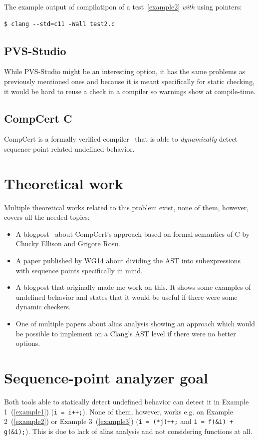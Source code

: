 The example output of compilatipon of a test~\ref{example2} \emph{with} using pointers:
\begin{lstlisting}
$ clang --std=c11 -Wall test2.c 
\end{lstlisting}
\subsection{PVS-Studio}
While PVS-Studio might be an interesting option, it has the same problems as previously mentioned ones and because it is meant specifically for static checking, it would be hard to reuse a check in a compiler so warnings show at compile-time.
\subsection{CompCert C}
CompCert is a formally verified compiler~\cite{CompCert} that is able to \emph{dynamically} detect sequence-point related undefined behavior.
\section{Theoretical work}
Multiple theoretical works related to this problem exist, none of them, however, covers all the needed topics:
\begin{itemize}
\item A blogpost~\cite{CompCertBlogpost} about CompCert's approach based on formal semantics of C by Chucky Ellison and Grigore Rosu.~\cite{formalSemantics}
\item A paper published by WG14 about dividing the AST into subexpressions with sequence points specifically in mind.~\cite{seqPointWG14}
\item A blogpost that originally made me work on this. It shows some examples of undefined behavior and states that it would be useful if there were some dynamic checkers.~\cite{regehr}
\item One of multiple papers about alias analysis showing an approach which would be possible to implement on a Clang's AST level if there were no better options.~\cite{steensgaard}
\end{itemize}
\section{Sequence-point analyzer goal}
Both tools able to statically detect undefined behavior can detect it in Example 1~(\ref{example1}) (\verb|i = i++;|). None of them, however, works e.g. on Example 2~(\ref{example2}) or Example 3~(\ref{example3}) (\verb|i = (*j)++;| and \verb|i = f(&i) + g(&i);|). This is due to lack of alias analysis and not considering functions at all.

